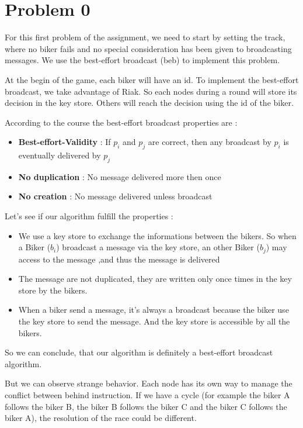 \documentclass{article}
\begin{document}
\section*{Problem 0}
For this first problem of the assignment, we need to start by setting the track, where no biker fails and no special
consideration has been given to broadcasting messages. We use the best-effort broadcast (beb) to implement 
this problem.\newline


At the begin of the game, each biker will have an id.  To implement the best-effort broadcast, we take advantage of
Riak. So each nodes during a round will store its decision in the key store. Others will reach the decision using the id of 
the biker.\newline


According to the course the best-effort broadcast properties are :
\begin{itemize}
\item \textbf{Best-effort-Validity} : If $p_{i}$ and  $p_{j}$ are correct, then any broadcast by  $p_{i}$ is eventually delivered by  $p_{j}$
\item \textbf{No duplication} : No message delivered more then once
\item \textbf{No creation} : No message delivered unless broadcast
\end{itemize}

Let's see if our algorithm fulfill the properties :
\begin{itemize}
\item We use a key store to exchange the informations between the bikers. So when a Biker ($b_{i}$) broadcast a message via the key store,
an other Biker ($b_{j}$) may access to the message ,and thus the message is delivered
\item The message are not duplicated, they are written only once times in the key store by the bikers.
\item When a biker send a message, it's always a broadcast because the biker use the key store to send the message. And the key store is
accessible by all the bikers.
\end{itemize}

So we can conclude, that our algorithm is definitely a best-effort broadcast algorithm.\newline

But we can observe strange behavior. Each node has its own way to manage the conflict between behind instruction. If we have a cycle (for example
the biker A follows the biker B, the biker B follows the biker C and the biker C follows the biker A), the resolution of the race could be different.
\end{document}
